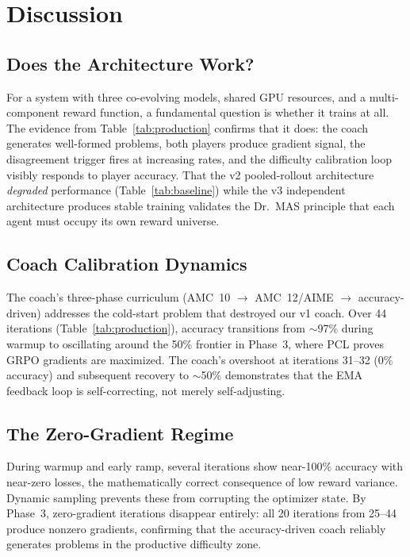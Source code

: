 \documentclass{article}
\begin{document}
\section{Discussion}

\subsection{Does the Architecture Work?}

For a system with three co-evolving models, shared GPU resources, and a multi-component reward function, a fundamental question is whether it trains at all. The evidence from Table~\ref{tab:production} confirms that it does: the coach generates well-formed problems, both players produce gradient signal, the disagreement trigger fires at increasing rates, and the difficulty calibration loop visibly responds to player accuracy. That the v2 pooled-rollout architecture \emph{degraded} performance (Table~\ref{tab:baseline}) while the v3 independent architecture produces stable training validates the Dr.~MAS principle that each agent must occupy its own reward universe.

\subsection{Coach Calibration Dynamics}

The coach's three-phase curriculum (AMC~10 $\rightarrow$ AMC~12/AIME $\rightarrow$ accuracy-driven) addresses the cold-start problem that destroyed our v1 coach. Over 44 iterations (Table~\ref{tab:production}), accuracy transitions from ${\sim}$97\% during warmup to oscillating around the 50\% frontier in Phase~3, where PCL \citep{pcl2025} proves GRPO gradients are maximized. The coach's overshoot at iterations 31--32 (0\% accuracy) and subsequent recovery to ${\sim}$50\% demonstrates that the EMA feedback loop is self-correcting, not merely self-adjusting.

\subsection{The Zero-Gradient Regime}

During warmup and early ramp, several iterations show near-100\% accuracy with near-zero losses, the mathematically correct consequence of low reward variance. Dynamic sampling prevents these from corrupting the optimizer state. By Phase~3, zero-gradient iterations disappear entirely: all 20 iterations from 25--44 produce nonzero gradients, confirming that the accuracy-driven coach reliably generates problems in the productive difficulty zone.
\end{document}
